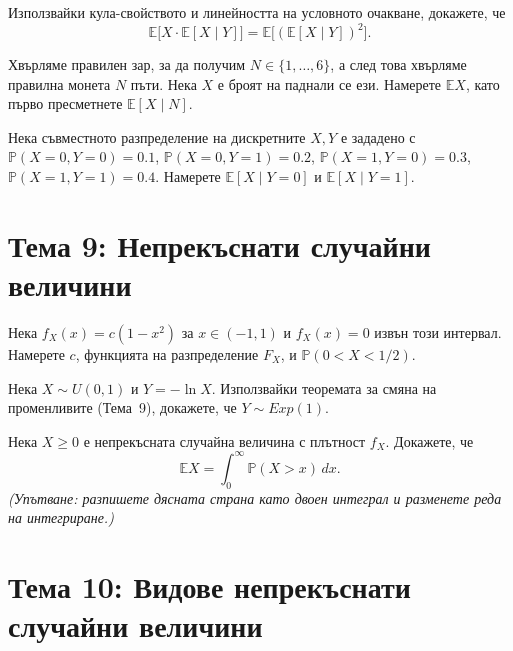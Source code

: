 \begin{probbox}[Задача 8.1]
Използвайки кула-свойството и линейността на условното очакване,
докажете, че
\[
  \mathbb E\big[X\cdot \mathbb E[X\mid Y]\big] = \mathbb E\big[(\mathbb E[X\mid Y])^2\big].
\]
\end{probbox}

\begin{probbox}[Задача 8.2]
Хвърляме правилен зар, за да получим $N\in\{1,\dots,6\}$, а след
това хвърляме правилна монета $N$ пъти. Нека $X$ е броят на паднали
се ези. Намерете $\mathbb EX$, като първо пресметнете $\mathbb E[X
\mid N]$.
\end{probbox}

\begin{probbox}[Задача 8.3]
Нека съвместното разпределение на дискретните $X,Y$ е зададено с
$\mathbb P(X=0,Y=0)=0.1$, $\mathbb P(X=0,Y=1)=0.2$, $\mathbb
P(X=1,Y=0)=0.3$, $\mathbb P(X=1,Y=1)=0.4$. Намерете $\mathbb E[X\mid
Y=0]$ и $\mathbb E[X\mid Y=1]$.
\end{probbox}

\section*{Тема 9: Непрекъснати случайни величини}

\begin{probbox}[Задача 9.1]
Нека $f_X(x)=c(1-x^2)$ за $x\in(-1,1)$ и $f_X(x)=0$ извън този
интервал. Намерете $c$, функцията на разпределение $F_X$, и
$\mathbb P(0<X<1/2)$.
\end{probbox}

\begin{probbox}[Задача 9.2]
Нека $X\sim U(0,1)$ и $Y=-\ln X$. Използвайки теоремата за смяна на
променливите (Тема~9), докажете, че $Y\sim Exp(1)$.
\end{probbox}

\begin{probbox}[Задача 9.3]
Нека $X\ge0$ е непрекъсната случайна величина с плътност $f_X$.
Докажете, че
\[
  \mathbb EX = \int_0^{\infty} \mathbb P(X>x)\,dx.
\]
\emph{(Упътване: разпишете дясната страна като двоен интеграл и
разменете реда на интегриране.)}
\end{probbox}

\section*{Тема 10: Видове непрекъснати случайни величини}


